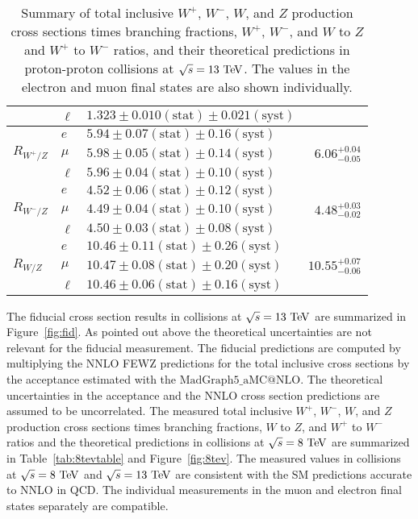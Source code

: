 \begin{table*}[tbhp]
\begin {tabular} {lllr}
  & $\ell$ & $1.323 \pm 0.010 \mathrm{(stat)}\pm 0.021 \mathrm{(syst)}$ & \\
\hline
             & $e$   & $5.94 \pm 0.07 \mathrm{(stat)}\pm 0.16 \mathrm{(syst)}$ &
             \\
$R_{W^{+}/Z}$   & $\mu$ & $5.98 \pm 0.05 \mathrm{(stat)}\pm 0.14 \mathrm{(syst)}$ & $6.06^{+0.04}_{-0.05}$ \\
             & $\ell$ & $5.96 \pm 0.04 \mathrm{(stat)}\pm 0.10 \mathrm{(syst)}$ &  \\
\hline
             & $e$   & $4.52 \pm 0.06 \mathrm{(stat)}\pm 0.12 \mathrm{(syst)}$ &
             \\
$R_{W^{-}/Z}$   & $\mu$ & $4.49 \pm 0.04 \mathrm{(stat)}\pm 0.10 \mathrm{(syst)}$ & $4.48^{+0.03}_{-0.02}$ \\
             & $\ell$ & $4.50 \pm 0.03 \mathrm{(stat)}\pm 0.08 \mathrm{(syst)}$ &  \\
\hline
             & $e$   & $10.46 \pm 0.11 \mathrm{(stat)}\pm 0.26 \mathrm{(syst)}$ &
             \\
$R_{W/Z}$   & $\mu$ & $10.47 \pm 0.08 \mathrm{(stat)}\pm 0.20 \mathrm{(syst)}$ & $10.55^{+0.07}_{-0.06}$ \\
             & $\ell$ & $10.46 \pm 0.06 \mathrm{(stat)}\pm 0.16 \mathrm{(syst)}$ &  \\
\hline
\end{tabular}
\caption{ \label{tab:results13}
Summary of total inclusive $W^{+}$, $W^{-}$, $W$, and $Z$ production cross sections times
branching fractions, $W^{+}$,  $W^{-}$, and $W$ to $Z$ and $W^{+}$ to $W^{-}$ ratios, and their
theoretical predictions in proton-proton collisions at $\sqrt{s}=13~\mathrm{Te\kern -0.1em V}$. The values in the electron and muon final states are also shown individually.}
\end{table*}
The fiducial cross section results in collisions at $\sqrt{s}=13~\mathrm{Te\kern -0.1em V}$ are summarized in Figure~\ref{fig:fid}. As pointed out above the theoretical uncertainties are not relevant for the fiducial measurement. The fiducial predictions are computed by multiplying the NNLO FEWZ predictions for the total inclusive cross sections by the acceptance estimated with the $\mathrm{MadGraph5}\_\mathrm{aMC@NLO}$. The theoretical uncertainties in the acceptance and the NNLO cross section predictions are assumed to be uncorrelated. The measured total inclusive $W^+$, $W^-$, $W$, and $Z$ production cross sections times branching fractions, $W$ to $Z$, and $W^+$ to $W^-$ ratios and the theoretical predictions in collisions at $\sqrt{s}=8~\mathrm{Te\kern -0.1em V}$ are summarized in Table~\ref{tab:8tevtable} and Figure~\ref{fig:8tev}. The measured values in collisions at $\sqrt{s}=8~\mathrm{Te\kern -0.1em V}$ and $\sqrt{s}=13~\mathrm{Te\kern -0.1em V}$ are consistent with the SM predictions accurate to NNLO in QCD. The individual measurements in the muon and electron final states separately are compatible. 
